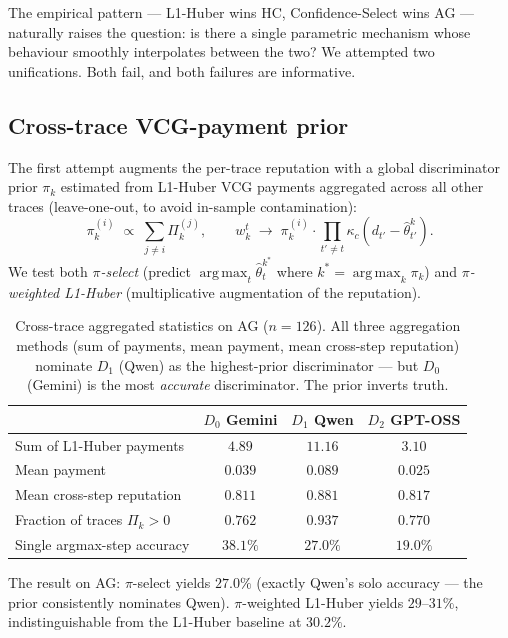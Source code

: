\documentclass[11pt]{article}
\DeclareMathOperator*{\argmax}{arg\,max}
\newcommand{\thetahat}{\hat{\theta}}
\begin{document}
The empirical pattern --- L1-Huber wins HC, Confidence-Select wins AG ---
naturally raises the question: is there a single parametric mechanism whose
behaviour smoothly interpolates between the two? We attempted two
unifications. Both fail, and both failures are informative.

\subsection{Cross-trace VCG-payment prior}

The first attempt augments the per-trace reputation with a global
discriminator prior $\pi_k$ estimated from L1-Huber VCG payments aggregated
across all other traces (leave-one-out, to avoid in-sample contamination):
\[
\pi_k^{(i)} \;\propto\; \sum_{j \neq i} \Pi_k^{(j)},
\qquad
w_k^t \;\to\; \pi_k^{(i)} \cdot \prod_{t' \neq t} \kappa_c(d_{t'} - \thetahat^k_{t'}).
\]
We test both \emph{$\pi$-select} (predict $\argmax_t \thetahat^{k^*}_t$
where $k^* = \argmax_k \pi_k$) and \emph{$\pi$-weighted L1-Huber}
(multiplicative augmentation of the reputation).

\begin{table}[h]
\centering
\small
\caption{Cross-trace aggregated statistics on AG ($n = 126$). All three
aggregation methods (sum of payments, mean payment, mean cross-step
reputation) nominate $D_1$ (Qwen) as the highest-prior discriminator ---
but $D_0$ (Gemini) is the most \emph{accurate} discriminator. The prior
inverts truth.}
\label{tab:crosstrace-stats}
\begin{tabular}{lccc}
\toprule
& $D_0$ Gemini & $D_1$ Qwen & $D_2$ GPT-OSS \\
\midrule
Sum of L1-Huber payments       & $4.89$           & $\mathbf{11.16}$ & $3.10$ \\
Mean payment                    & $0.039$          & $\mathbf{0.089}$ & $0.025$ \\
Mean cross-step reputation      & $0.811$          & $\mathbf{0.881}$ & $0.817$ \\
Fraction of traces $\Pi_k > 0$  & $0.762$          & $\mathbf{0.937}$ & $0.770$ \\
\midrule
Single argmax-step accuracy     & $\mathbf{38.1\%}$ & $27.0\%$         & $19.0\%$ \\
\bottomrule
\end{tabular}
\end{table}

The result on AG: $\pi$-select yields $27.0\%$ (exactly Qwen's solo
accuracy --- the prior consistently nominates Qwen). $\pi$-weighted
L1-Huber yields $29\text{--}31\%$, indistinguishable from the L1-Huber
baseline at $30.2\%$.
\end{document}
